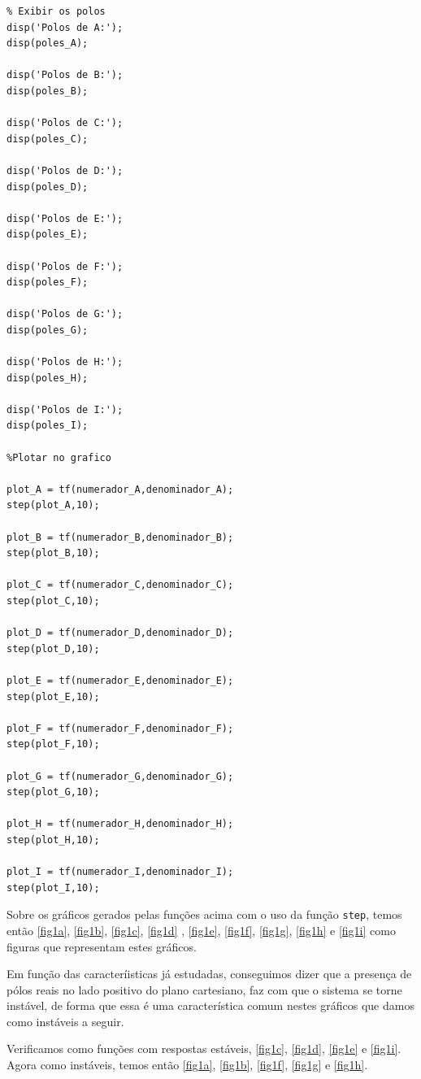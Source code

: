 \documentclass[a4paper,12pt]{article}
\begin{document}
\begin{enumerate}
\begin{lstlisting}
% Exibir os polos
disp('Polos de A:');
disp(poles_A);

disp('Polos de B:');
disp(poles_B);

disp('Polos de C:');
disp(poles_C);

disp('Polos de D:');
disp(poles_D);

disp('Polos de E:');
disp(poles_E);

disp('Polos de F:');
disp(poles_F);

disp('Polos de G:');
disp(poles_G);

disp('Polos de H:');
disp(poles_H);

disp('Polos de I:');
disp(poles_I);

%Plotar no grafico

plot_A = tf(numerador_A,denominador_A);
step(plot_A,10);

plot_B = tf(numerador_B,denominador_B);
step(plot_B,10);

plot_C = tf(numerador_C,denominador_C);
step(plot_C,10);

plot_D = tf(numerador_D,denominador_D);
step(plot_D,10);

plot_E = tf(numerador_E,denominador_E);
step(plot_E,10);

plot_F = tf(numerador_F,denominador_F);
step(plot_F,10);

plot_G = tf(numerador_G,denominador_G);
step(plot_G,10);

plot_H = tf(numerador_H,denominador_H);
step(plot_H,10);

plot_I = tf(numerador_I,denominador_I);
step(plot_I,10);
        \end{lstlisting}
        Sobre os gráficos gerados pelas funções acima com o uso da função \texttt{step}, temos então \ref{fig1a}, \ref{fig1b}, \ref{fig1c}, \ref{fig1d}
        , \ref{fig1e}, \ref{fig1f}, \ref{fig1g}, \ref{fig1h} e \ref{fig1i} como figuras que representam estes gráficos.


        Em função das caracteríisticas já estudadas, conseguimos dizer que a presença de pólos reais no lado positivo do plano cartesiano,
        faz com que o sistema se torne instável, de forma que essa é uma característica comum nestes gráficos que damos como instáveis a seguir.

        Verificamos como funções com respostas estáveis, \ref{fig1c}, \ref{fig1d}, \ref{fig1e} e \ref{fig1i}. Agora como instáveis, temos então
        \ref{fig1a}, \ref{fig1b}, \ref{fig1f}, \ref{fig1g} e \ref{fig1h}.


\end{enumerate}
\end{document}
